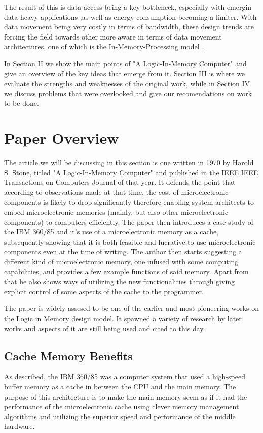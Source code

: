 \documentclass[12pt,twocolumn]{IEEEtran}
\begin{document}
The result of this is data access being a key bottleneck, especially with emergin data-heavy applications ,as well as energy consumption becoming a limiter. With data movement being very costly in terms of bandwidth, these design trends are forcing the field towards other more aware in terms of data movement architectures, one of which is the In-Memory-Processing model \cite{PAPER:1}.


In Section II we show the main points of "A Logic-In-Memory Computer" and give an overview of the key ideas that emerge from it. Section III is where we evaluate the strengths and weaknesses of the original work, while in Section IV we discuss problems that were overlooked and give our recomendations on work to be done.


\section{Paper Overview}

The article we will be discussing in this section is one written in 1970 by Harold S. Stone, titled  "A Logic-In-Memory Computer" and published in the IEEE IEEE Transactions on Computers Journal of that year. It defends the point that according to observations made at that time\cite{ARTICLE:2}, the cost of microelectronic components is likely to drop significantly therefore enabling system architects to embed microelectronic memories (mainly, but also other microelectronic components) to computers efficiently. The paper then introduces a case study of the IBM 360/85 \cite{WEBSITE:1} and it's use of a microelectronic memory as a cache, subsequently showing that it is both feasible and lucrative to use microelectronic components even at the time of writing. The author then starts suggesting a different kind of microelectronic memory, one infused with some computing capabilities, and provides a few example functions of said memory. Apart from that he also shows ways of utilizing the new functionalities through giving explicit control of some aspects of the cache to the programmer.

The paper is widely assesed to be one of the earlier and most pioneering works on the Logic in Memory design model. It spawned a variety of research by later works and aspects of it are still being used and cited to this day.

\subsection{Cache Memory Benefits}
As described, the IBM 360/85 was a computer system that used a high-speed buffer memory as a cache in between the CPU and the main memory. The purpose of this architecture is to make the main memory seem as if it had the performance of the microelectronic cache using clever memory management algorithms and utilizing the superior speed and performance of the middle hardware.
\end{document}
